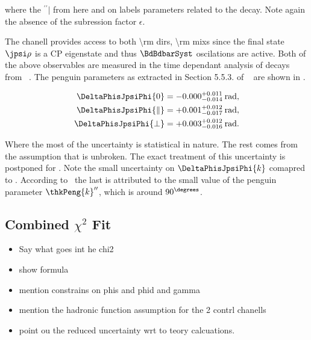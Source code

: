 \noindent where the ${}^{\prime\prime}|$ from here and on labels parameters related to the \BdJpsiRho decay.
Note again the absence of the subression factor $\epsilon$.

The \BdJpsiRho chanell provides access to both \Acp{\rm dir}, \Acp{\rm mix} since the final state $\jpsi\rho$ is
a CP eigenstate and thus $\BdBdbarSyst$ oscilations are active. Both of the above observables are measured in the
time dependant analysis of \BdJpsipipi decays from \lhcb~\cite{Aaij:2014vda}. The penguin parameters as extracted
in Section 5.5.3. of ~\cite{DeBruyn-thesis} are shown in .

\begin{subequations}
  \label{delta_phis_jpsirho}
  \begin{align}
    \DeltaPhisJpsiPhi{0}         & = -0.000^{+0.011}_{-0.014}\:\text{rad},\\
    \DeltaPhisJpsiPhi{\parallel} & = +0.001^{+0.012}_{-0.017}\:\text{rad},\\
    \DeltaPhisJpsiPhi{\perp}     & = +0.003^{+0.012}_{-0.016}\:\text{rad}.
  \end{align}
\end{subequations}

\noindent Where the most of the uncertainty is statistical in nature. The rest comes from the assumption that \grpsuthree is
unbroken. The exact treatment of this uncertainty is postponed for . Note the small uncertainty on
$\DeltaPhisJpsiPhi{k}$ comapred to . According to~\cite{DeBruyn-thesis} the last is attributed
to the small value of the penguin parameter $\thkPeng{k}''$, which is around $90^{\degrees}$.

\subsection{Combined $\chi^2$ Fit}
\label{penguin_chi2_fit}

\begin{itemize}
 \item Say what goes int he chi2
 \item show formula
 \item mention constrains on phis and phid and gamma
 \item mention the hadronic function assumption for the 2 contrl chanells
 \item point ou the reduced uncertainty wrt to teory calcuations.
\end{itemize}

